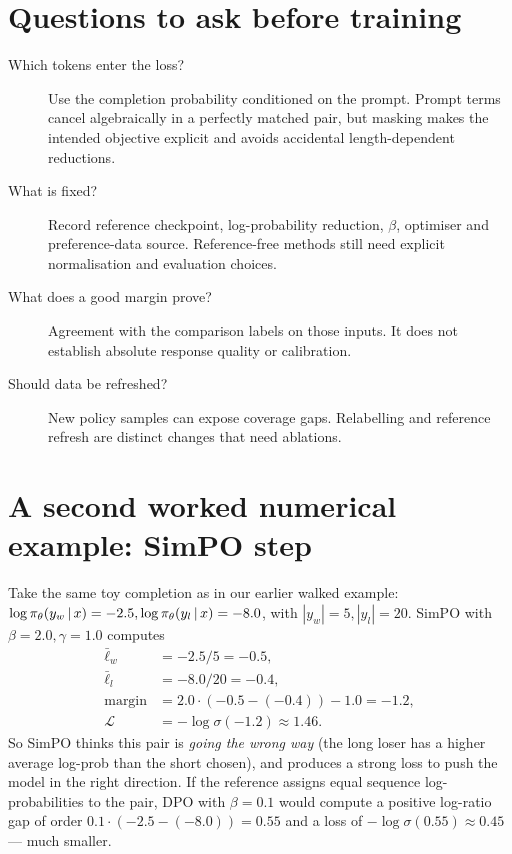 \documentclass[11pt,oneside]{scrbook}
\begin{document}
\section{Questions to ask before training}
\begin{description}
\item[Which tokens enter the loss?] Use the completion probability conditioned
on the prompt. Prompt terms cancel algebraically in a perfectly matched pair,
but masking makes the intended objective explicit and avoids accidental
length-dependent reductions.
\item[What is fixed?] Record reference checkpoint, log-probability reduction,
$\beta$, optimiser and preference-data source. Reference-free methods still
need explicit normalisation and evaluation choices.
\item[What does a good margin prove?] Agreement with the comparison labels on
those inputs. It does not establish absolute response quality or calibration.
\item[Should data be refreshed?] New policy samples can expose coverage gaps.
Relabelling and reference refresh are distinct changes that need ablations.
\end{description}

\section{A second worked numerical example: SimPO step}

Take the same toy completion as in our earlier walked example:
$\log\pi_\theta(y_w \,\vert\, x) = -2.5, \log\pi_\theta(y_l \,\vert\, x) = -8.0$,
with $|y_w| = 5, |y_l| = 20$. SimPO with $\beta = 2.0, \gamma = 1.0$
computes
\begin{align*}
\bar\ell_w &= -2.5 / 5 = -0.5, \\
\bar\ell_l &= -8.0 / 20 = -0.4, \\
\text{margin} &= 2.0 \cdot (-0.5 - (-0.4)) - 1.0 = -1.2, \\
\mathcal{L} &= -\log\sigma(-1.2) \approx 1.46.
\end{align*}
So SimPO thinks this pair is \emph{going the wrong way} (the long
loser has a higher average log-prob than the short chosen), and
produces a strong loss to push the model in the right direction.
If the reference assigns equal sequence log-probabilities to the pair,
DPO with $\beta = 0.1$ would compute a positive
log-ratio gap of order $0.1 \cdot (-2.5 - (-8.0)) = 0.55$ and a
loss of $-\log\sigma(0.55) \approx 0.45$ --- much smaller.
\end{document}
